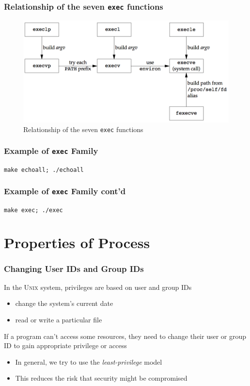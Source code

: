 \documentclass[newPxFont,sthlmFooter,nooffset]{beamer}
\begin{document}
\begin{frame}[fragile,t]
  \frametitle{Relationship of the seven \texttt{exec} functions}
  \begin{figure}[h]
    \centering
    \includegraphics[width=0.9\linewidth]{figure/fig8-15_relationship.png}
    \caption{Relationship of the seven \texttt{exec} functions}
    \label{fig:relexec}
  \end{figure}
\end{frame}

\begin{frame}[containsverbatim,t]
  \frametitle{Example of \texttt{exec} Family}
\texttt{make echoall; ./echoall}



\end{frame}


\begin{frame}[containsverbatim,t]
  \frametitle{Example of \texttt{exec} Family cont'd}
\texttt{make exec; ./exec}



\end{frame}



\section{Properties of Process}

\begin{frame}[t]
  \frametitle{Changing User IDs and Group IDs}
In the \textsc{Unix} system, privileges are based on user and group IDs
\begin{itemize}
\item change the system's current date
\item read or write a particular file
\end{itemize}

If a program can't access some resources, they need to change their user or group ID to gain appropriate privilege or access
\begin{itemize}
\item In general, we try to use the \textit{least-privilege} model
\item This reduces the risk that security might be compromised
\end{itemize}
\end{frame}
\end{document}
